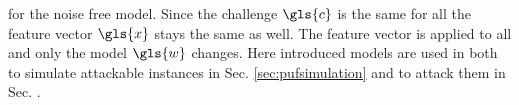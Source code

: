 for the noise free \xpuf model.
Since the challenge $\gls{c}$ is the same for all \apufs the feature vector $\gls{x}$ stays the same as well.
The feature vector is applied to all \apufs and only the \apuf model $\gls{w}$ changes.
Here introduced models are used in both to simulate attackable \apuf instances in Sec. \ref{sec:pufsimulation} and to attack them in Sec. .






